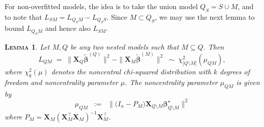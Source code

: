 \documentclass[aos]{imsart}
\theoremstyle{plain}
\newtheorem{lem}{\textsc{Lemma}}[section]
\newcommand{\david}[1]{{\small{\color{blue} \sf $\heartsuit$ David: #1}}}
\newcommand{\paul}[1]{{\small{\color{green} \sf $\spadesuit$ Paul: #1}}}
\newcommand{\E}{\mathbb{E}}
\newcommand{\bs}{\boldsymbol}
\begin{document}
For non-overfitted  models, the idea is to take the union model $Q_S=S\cup M$, and to note that $L_{SM}=L_{Q_SM}-L_{Q_SS}$. Since $M \subset Q_S$, we may use the next lemma to bound $L_{Q_SM}$ and hence also $L_{SM}$.
\begin{lem}\label{lemma:s7}
    Let $M,Q$ be any two nested models such that $M \subseteq Q$. Then
$$
L_{QM}\;=\;\|\bs X_{Q}\tilde{\bs\beta}^{(Q)}\|^2-\|\bs X_{M}\tilde{\bs\beta}^{(M)}\|^2\;\sim\; \chi_{|Q\setminus M|}^2\left(\mu_{Q M}\right), 
$$
where $\chi_{k}^2(\mu)$ denotes the noncentral chi-squared distribution with $k$ degrees of freedom and noncentrality parameter $\mu$. The noncentrality parameter $\mu_{QM}$ is given by \begin{equation}\label{eq:muQM}
    \mu_{QM}\;\;:=\;\;\|\big(I_n-P_M\big) \bs X_{Q\setminus M} \bs \beta^{\star}_{Q\setminus M}\|^2
\end{equation}
where $P_M=\bs X_{M}\left(\bs X_{M}^{\top} \bs X_{M}\right)^{-1} \bs X_{M}^{\top}$.
\end{lem}






\end{document}
